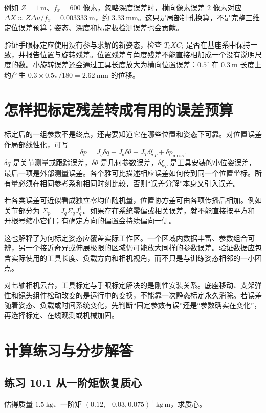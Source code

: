 例如 $Z=1\ \mathrm m$、$f_x=600$ 像素，忽略深度误差时，横向像素误差 $2$ 像素对应 $\Delta X\approx Z\Delta u/f_x=0.003333\ \mathrm m$，约 $3.33\ \mathrm{mm}$。这只是局部针孔换算，不是完整三维定位误差预算；姿态、深度和标定板检测误差也会贡献。

验证手眼标定应使用没有参与求解的新姿态，检查 $T_iXC_i$ 是否在基座系中保持一致，并报告位置与旋转残差。位置残差与角度残差不能直接相加成一个没有说明尺度的数。小旋转误差还会通过工具长度放大为横向位置误差：$0.5^\circ$ 在 $0.3\ \mathrm m$ 长度上约产生 $0.3\times0.5\pi/180=2.62\ \mathrm{mm}$ 的位移。

\section{怎样把标定残差转成有用的误差预算}
标定后的一组参数不是终点，还需要知道它在哪些位置和姿态下可靠。对位置误差作局部线性化，可写
\[
 \delta p=J_q\delta q+J_\theta\delta\theta+J_T\delta\xi_T+\delta p_{\mathrm{meas}}.
\]
$\delta q$ 是关节测量或跟踪误差，$\delta\theta$ 是几何参数误差，$\delta\xi_T$ 是工具安装的小位姿误差，最后一项是外部测量误差。各个雅可比描述相应误差如何传到同一个位置坐标。所有量必须在相同参考系和相同时刻比较，否则“误差分解”本身又引入误差。

若各类误差可近似看成独立零均值随机量，位置协方差可由各项传播后相加。例如关节部分为 $\Sigma_p=J_q\Sigma_qJ_q^{\mathsf T}$。如果存在系统零偏或相关误差，就不能直接按平方和开根号缩小它们；有确定方向的偏置会持续偏向一侧。

这也解释了为何标定姿态应覆盖实际工作区。一个区域内数据丰富、参数组合可辨，另一个接近奇异或伸展极限的区域仍可能放大同样的参数误差。验证数据应包含实际使用的工具长度、负载方向和相机视角，而不只是与训练姿态相邻的一小团点。

对七轴相机云台，工具标定与手眼标定解决的是刚性安装关系。底座移动、支架弹性和镜头组件松动改变的是运行中的变换，不能靠一次静态标定永久消除。若误差随着姿态、负载或时间系统变化，先判断“固定参数有误”还是“参数确实在变化”，再选择标定、在线观测或机械加固。

\section{计算练习与分步解答}
\subsection*{练习 10.1 从一阶矩恢复质心}
估得质量 $1.5\ \mathrm{kg}$、一阶矩 $(0.12,-0.03,0.075)^{\mathsf T}\ \mathrm{kg\,m}$，求质心。

